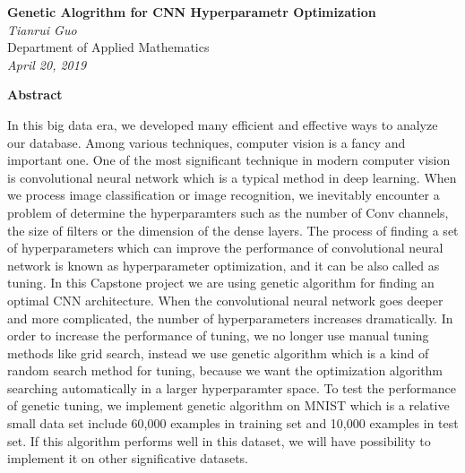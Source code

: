 \documentclass[12pt]{article}
\begin{document}
\begin{titlepage}
   \begin{center}
      \Large\textbf{Genetic Alogrithm for CNN Hyperparametr Optimization}\\
      \large\textit{Tianrui Guo}\\
      \large Department of Applied Mathematics\\
      \large\textit{April 20, 2019}
   \end{center}
\end{titlepage}
\pagebreak

\setlength{\baselineskip}{10mm}
\begin{center}
\LARGE \textbf{Abstract}
\end{center}
In this big data era, we developed many efficient and effective ways to analyze our database. Among various techniques, computer vision is a fancy and important one. One of the most significant technique in modern computer vision is convolutional neural network which is a typical method in deep learning. When we process image classification or image recognition, we inevitably encounter a problem of determine the hyperparamters such as the number of Conv channels, the size of filters or the dimension of the dense layers. The process of finding a set of hyperparameters which can improve the performance of convolutional neural network is known as hyperparameter optimization, and it can be also called as tuning. In this Capstone project we are using genetic algorithm for finding an optimal CNN architecture. When the convolutional neural network goes deeper and more complicated, the number of hyperparameters increases dramatically. In order to increase the performance of tuning, we no longer use manual tuning methods like grid search,  instead we use genetic algorithm which is a kind of random search method for tuning, because we want the optimization algorithm searching automatically in a larger hyperparamter space.  To test the performance of genetic tuning, we implement genetic algorithm on MNIST which is a relative small data set include 60,000 examples in training set and 10,000 examples in test set. If this algorithm performs well in this dataset, we will have possibility to implement it on other significative datasets.\pagebreak
\end{document}
